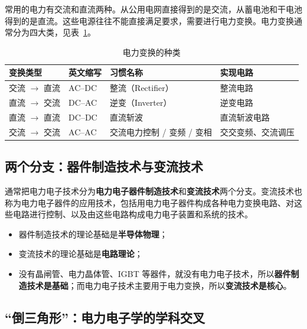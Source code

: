 常用的电力有交流和直流两种。从公用电网直接得到的是交流，从蓄电池和干电池得到的是直流。这些电源往往不能直接满足要求，需要进行电力变换。电力变换通常分为四大类，见表~\ref{tab:1-1}。

\begin{table}[htbp]
\centering
\caption{电力变换的种类}
\label{tab:1-1}
\begin{tabular}{llll}
\toprule
\textbf{变换类型} & \textbf{英文缩写} & \textbf{习惯名称} & \textbf{实现电路} \\
\midrule
交流 $\rightarrow$ 直流 & AC--DC & 整流（Rectifier） & 整流电路 \\
直流 $\rightarrow$ 交流 & DC--AC & 逆变（Inverter） & 逆变电路 \\
直流 $\rightarrow$ 直流 & DC--DC & 直流斩波 & 直流斩波电路 \\
交流 $\rightarrow$ 交流 & AC--AC & 交流电力控制 / 变频 / 变相 & 交交变频、交流调压 \\
\bottomrule
\end{tabular}
\end{table}


\subsection{两个分支：器件制造技术与变流技术}

通常把电力电子技术分为\textbf{电力电子器件制造技术}和\textbf{变流技术}两个分支。变流技术也称为电力电子器件的应用技术，包括用电力电子器件构成各种电力变换电路、对这些电路进行控制、以及由这些电路构成电力电子装置和系统的技术。

\begin{itemize}
  \item 器件制造技术的理论基础是\textbf{半导体物理}；
  \item 变流技术的理论基础是\textbf{电路理论}；
  \item 没有晶闸管、电力晶体管、IGBT 等器件，就没有电力电子技术，所以\textbf{器件制造技术是基础}；而电力电子技术主要用于电力变换，所以\textbf{变流技术是核心}。
\end{itemize}

\subsection{“倒三角形”：电力电子学的学科交叉}

